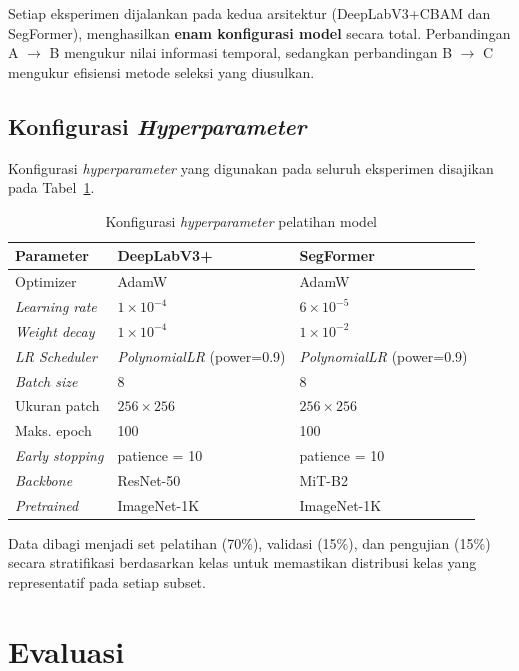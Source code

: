 Setiap eksperimen dijalankan pada kedua arsitektur (DeepLabV3+CBAM dan SegFormer), menghasilkan \textbf{enam konfigurasi model} secara total.
Perbandingan A $\to$ B mengukur nilai informasi temporal, sedangkan perbandingan B $\to$ C mengukur efisiensi metode seleksi yang diusulkan.

\subsection{Konfigurasi \textit{Hyperparameter}}

Konfigurasi \textit{hyperparameter} yang digunakan pada seluruh eksperimen disajikan pada Tabel~\ref{tab:hyperparams}.

\begin{table}[htbp]
\centering
\caption{Konfigurasi \textit{hyperparameter} pelatihan model}
\label{tab:hyperparams}
\begin{tabular}{lll}
\hline
\textbf{Parameter} & \textbf{DeepLabV3+} & \textbf{SegFormer} \\
\hline
Optimizer          & AdamW               & AdamW \\
\textit{Learning rate} & $1 \times 10^{-4}$ & $6 \times 10^{-5}$ \\
\textit{Weight decay}  & $1 \times 10^{-4}$ & $1 \times 10^{-2}$ \\
\textit{LR Scheduler}  & \textit{PolynomialLR} (power=0.9) & \textit{PolynomialLR} (power=0.9) \\
\textit{Batch size}    & 8                  & 8 \\
Ukuran patch       & $256\times256$      & $256\times256$ \\
Maks. epoch        & 100                 & 100 \\
\textit{Early stopping} & patience = 10   & patience = 10 \\
\textit{Backbone}      & ResNet-50          & MiT-B2 \\
\textit{Pretrained}    & ImageNet-1K        & ImageNet-1K \\
\hline
\end{tabular}
\end{table}

Data dibagi menjadi set pelatihan (70\%), validasi (15\%), dan pengujian (15\%) secara stratifikasi berdasarkan kelas untuk memastikan distribusi kelas yang representatif pada setiap subset.

\section{Evaluasi}


